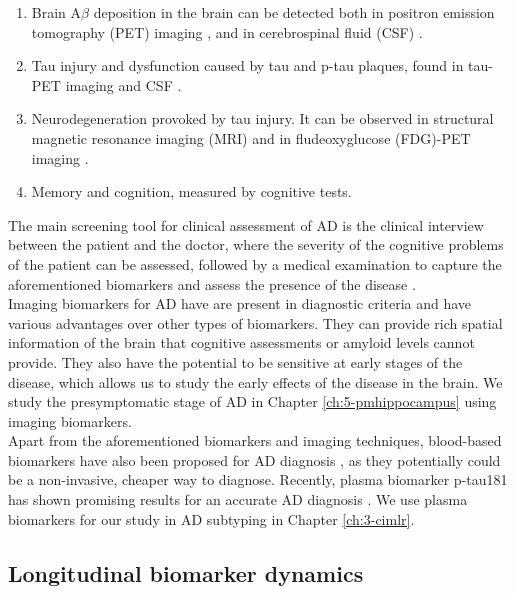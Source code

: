 \begin{enumerate}\itemsep5pt
\item Brain A$\beta$ deposition in the brain can be detected both in positron emission tomography (PET) imaging \cite{Clark2011}, and in cerebrospinal fluid (CSF) \cite{Andreasen1999}.
\item Tau injury and dysfunction caused by tau and p-tau plaques, found in tau-PET imaging and CSF \cite{Andreasen1999,Blennow2010}.
\item Neurodegeneration provoked by tau injury. It can be observed in structural magnetic resonance imaging (MRI) \cite{Weiner2005} and in fludeoxyglucose (FDG)-PET imaging \cite{Chetelat2003}.
\item Memory and cognition, measured by cognitive tests.
\end{enumerate}

The main screening tool for clinical assessment of AD is the clinical interview between the patient and the doctor, where the severity of the cognitive problems of the patient can be assessed, followed by a medical examination to capture the aforementioned biomarkers and assess the presence of the disease \cite{Lane2018}. \\

Imaging biomarkers for AD have are present in diagnostic criteria \cite{Lane2018} and have various advantages over other types of biomarkers. They can provide rich spatial information of the brain that cognitive assessments or amyloid levels cannot provide. They also have the potential to be sensitive at early stages of the disease, which allows us to study the early effects of the disease in the brain. We study the presymptomatic stage of AD in Chapter \ref{ch:5-pmhippocampus} using imaging biomarkers.  \\

Apart from the aforementioned biomarkers and imaging techniques, blood-based biomarkers have also been proposed for AD diagnosis \cite{Shi2018}, as they potentially could be a non-invasive, cheaper way to diagnose. Recently, plasma biomarker p-tau181 has shown promising results for an accurate AD diagnosis \cite{Karikari2020,Moscoso2020}. We use plasma biomarkers for our study in AD subtyping in Chapter \ref{ch:3-cimlr}. \\

\subsection{Longitudinal biomarker dynamics}

